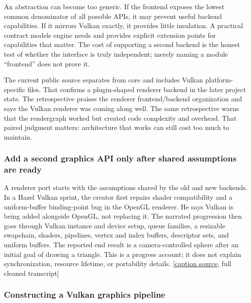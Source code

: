 An abstraction can become too generic. If the frontend exposes the lowest common denominator of all possible APIs, it may prevent useful backend capabilities. If it mirrors Vulkan exactly, it provides little insulation. A practical contract models engine needs and provides explicit extension points for capabilities that matter. The cost of supporting a second backend is the honest test of whether the interface is truly independent; merely naming a module ``frontend'' does not prove it.

The current public source separates  from core and includes Vulkan platform-specific files. That confirms a plugin-shaped renderer backend in the later project state. The retrospective praises the renderer frontend/backend organization and says the Vulkan renderer was coming along well. The same retrospective warns that the rendergraph worked but created code complexity and overhead. That paired judgment matters: architecture that works can still cost too much to maintain.

\subsubsection{Add a second graphics API only after shared assumptions are ready}\label{06-engine-ii-ch025-add-a-second-graphics-api-only-after-shared-assumptions-are-ready}

\hypertarget{06-engine-ii-ch025-add-a-second-graphics-api-only-after-shared-assumptions-are-ready}{}

A renderer port starts with the assumptions shared by the old and new backends. In a Hazel Vulkan sprint, the creator first repairs shader compatibility and a uniform-buffer binding-point bug in the OpenGL renderer. He says Vulkan is being added alongside OpenGL, not replacing it. The narrated progression then goes through Vulkan instance and device setup, queue families, a resizable swapchain, shaders, pipelines, vertex and index buffers, descriptor sets, and uniform buffers. The reported end result is a camera-controlled sphere after an initial goal of drawing a triangle. This is a progress account; it does not explain synchronization, resource lifetime, or portability details. {[}\href{https://www.youtube.com/watch?v=zUdaT19aSxA}{caption source}, full cleaned transcript{]}

\subsubsection{Constructing a Vulkan graphics pipeline}\label{06-engine-ii-ch025-constructing-a-vulkan-graphics-pipeline}

